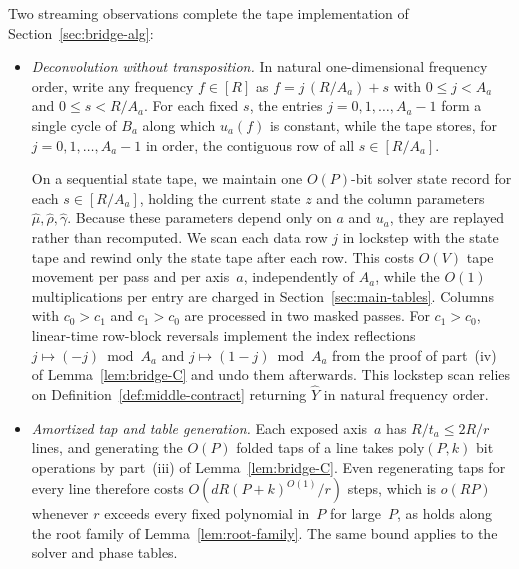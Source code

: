 Two streaming observations complete the tape implementation of Section~\ref{sec:bridge-alg}:
\begin{itemize}[leftmargin=*]
  \item \emph{Deconvolution without transposition.} In natural one-dimensional frequency order, write any frequency
    $f\in[R]$ as $f=j\,(R/A_a)+s$ with $0\le j<A_a$ and $0\le s<R/A_a$. For each fixed $s$, the entries
    $j=0,1,\dots,A_a-1$ form a single cycle of $B_a$ along which $u_a(f)$ is constant, while the tape stores, for
    $j=0,1,\dots,A_a-1$ in order, the contiguous row of all $s\in[R/A_a]$.

    On a sequential state tape, we maintain one $O(P)$-bit solver state record for each $s\in[R/A_a]$, holding the
    current state $z$ and the column parameters $\hat\mu,\hat\rho,\hat\gamma$. Because these parameters depend only on
    $a$ and $u_a$, they are replayed rather than recomputed. We scan each data row $j$ in lockstep with the state tape
    and rewind only the state tape after each row. This costs $O(V)$ tape movement per pass and per axis~$a$,
    independently of $A_a$, while the $O(1)$ multiplications per entry are charged in Section~\ref{sec:main-tables}.
    Columns with $c_0>c_1$ and $c_1>c_0$ are processed in two masked passes. For $c_1>c_0$, linear-time row-block
    reversals implement the index reflections $j\mapsto(-j)\bmod A_a$ and $j\mapsto(1-j)\bmod A_a$ from the proof of
    part~(iv) of Lemma~\ref{lem:bridge-C} and undo them afterwards. This lockstep scan relies on
    Definition~\ref{def:middle-contract} returning $\widehat Y$ in natural frequency order.

  \item \emph{Amortized tap and table generation.} Each exposed axis~$a$ has $R/t_a\le 2R/r$ lines, and generating the
    $O(P)$ folded taps of a line takes $\mathrm{poly}(P,k)$ bit operations by part~(iii) of Lemma~\ref{lem:bridge-C}. Even
    regenerating taps for every line therefore costs $O(dR(P+k)^{O(1)}/r)$ steps, which is $o(RP)$ whenever $r$
    exceeds every fixed polynomial in~$P$ for large~$P$, as holds along the root family of Lemma~\ref{lem:root-family}.
    The same bound applies to the solver and phase tables.
\end{itemize}
